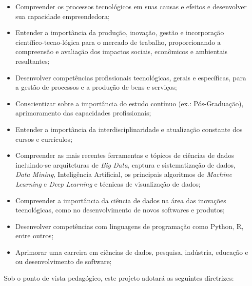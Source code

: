 \documentclass[a4paper, 12pt, openright, oneside, german, french, english, brazil]{abntex2}
\begin{document}
\begin{itemize}
\item Compreender os processos tecnológicos em suas causas e efeitos e desenvolver sua capacidade empreendedora;
\item Entender a importância da produção, inovação, gestão e incorporação científico-tecno-lógica para o mercado de trabalho, proporcionando a compreensão e avaliação dos impactos sociais, econômicos e ambientais resultantes;
\item Desenvolver competências profissionais tecnológicas, gerais e específicas, para a gestão de processos e a produção de bens e serviços;
\item Conscientizar sobre a importância do estudo contínuo (ex.: Pós-Graduação), aprimoramento das capacidades profissionais;
\item Entender a importância da interdisciplinaridade e atualização constante dos cursos e currículos;
\item Compreender as mais recentes ferramentas e tópicos de ciências de dados incluindo-se arquiteturas de \textit{Big Data}, captura e sistematização de dados, \textit{Data Mining}, Inteligência Artificial, os principais algoritmos de \textit{Machine Learning} e \textit{Deep Learning} e técnicas de visualização de dados;
\item Compreender a importância da ciência de dados na área das inovações tecnológicas, como no desenvolvimento de novos softwares e produtos;
\item Desenvolver competências com linguagens de programação como Python, R, entre outros;
\item Aprimorar uma carreira em ciências de dados, pesquisa, indústria, educação e ou desenvolvimento de software;
\end{itemize}

Sob o ponto de vista pedagógico, este projeto adotará as seguintes diretrizes:
\end{document}
